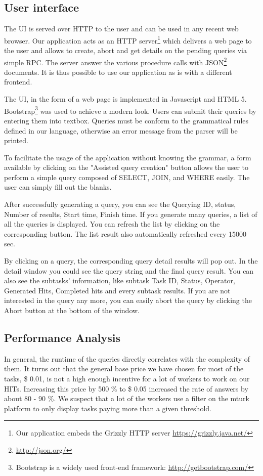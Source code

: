 \documentclass{article}
\begin{document}
\subsection{User interface}

The UI is served over HTTP to the user and can be used in any recent web
browser. Our application acts as an HTTP server\footnote{Our application embeds
the Grizzly HTTP server \url{https://grizzly.java.net/}} which delivers a web page to the
user and allows to create, abort and get details on the pending
queries via simple RPC. The server answer the various procedure calls with
JSON\footnote{\url{http://json.org/}} documents. It is thus possible to use our
application as is with a different frontend.

The UI, in the form of a web page is implemented in Javascript and HTML 5.
Bootstrap\footnote{Bootstrap is a widely used front-end framework:
\url{http://getbootstrap.com/}} was used to achieve a modern look.
Users can submit their queries by entering them into textbox. Queries must be conform to the
grammatical rules defined in our language, otherwise an error message from the parser will be printed.

To facilitate the usage of the application without knowing the grammar, a form
available by clicking on the "Assisted query creation" button allows the user
to perform a simple query composed of SELECT, JOIN, and WHERE easily. The user
can simply fill out the blanks.

After successfully generating a query, you can see the Querying ID, status, Number of results, Start time, Finish time. If you generate many queries, a list of all the queries is displayed. You can refresh the list by clicking on the corresponding button. The list result also automatically refreshed every 15000 sec. %

By clicking on a query, the corresponding query detail results will pop out. In the detail window you could see the query string and the final query result. You can also see the subtasks' information, like subtask Task ID, Status, Operator, Generated Hits, Completed hits and every subtask results. If you are not interested in the query any more, you can easily abort the query by clicking the Abort button at the bottom of the window.

\subsection{Performance Analysis}
In general, the runtime of the queries directly correlates with the complexity of them.
It turns out that the general base price we have chosen for most of the tasks, \$ 0.01, is not a high enough incentive for a lot of workers to work on our HITs. Increasing this price by 500 \% to \$ 0.05 increased the rate of answers by about 80 - 90 \%. We suspect that a lot of the workers use a filter on the mturk platform to only display tasks paying more than a given threshold. 
\end{document}
